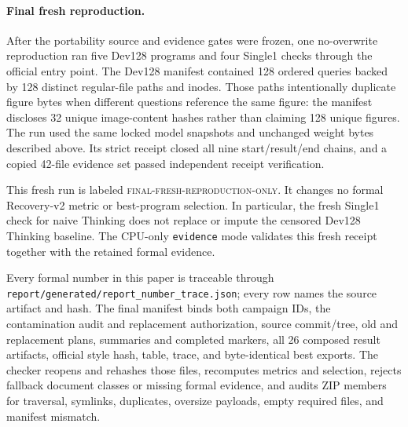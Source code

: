 \documentclass{article}
\begin{document}
\paragraph{Final fresh reproduction.}
After the portability source and evidence gates were frozen, one no-overwrite
reproduction ran five Dev128 programs and four Single1 checks through the official
entry point. The Dev128 manifest contained 128 ordered queries backed by 128
distinct regular-file paths and inodes. Those paths intentionally duplicate figure
bytes when different questions reference the same figure: the manifest discloses
32 unique image-content hashes rather than claiming 128 unique figures. The run
used the same locked model snapshots and unchanged weight bytes described above.
Its strict receipt closed all nine start/result/end chains, and a copied 42-file
evidence set passed independent receipt verification.

This fresh run is labeled \textsc{final-fresh-reproduction-only}. It changes no
formal Recovery-v2 metric or best-program selection. In particular, the fresh
Single1 check for naive Thinking does not replace or impute the censored
Dev128 Thinking baseline. The CPU-only \texttt{evidence} mode validates this fresh
receipt together with the retained formal evidence.

Every formal number in this paper is traceable through
\texttt{report/generated/report\_number\_trace.json}; every row names the source
artifact and hash. The final manifest binds both campaign IDs, the contamination
audit and replacement authorization, source commit/tree, old and replacement
plans, summaries and completed markers, all 26 composed result artifacts, official
style hash, table, trace, and byte-identical best exports. The checker reopens and rehashes those
files, recomputes metrics and selection, rejects fallback document classes or
missing formal evidence, and audits ZIP members for traversal, symlinks,
duplicates, oversize payloads, empty required files, and manifest mismatch.



\end{document}
